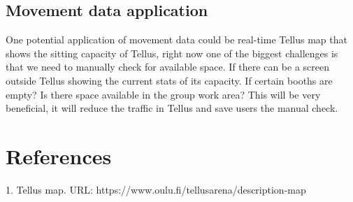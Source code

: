 \documentclass{article}
\begin{document}
\subsection{Movement data application}

One potential application of movement data could be real-time Tellus map that shows the sitting
capacity of Tellus, right now one of the biggest challenges is that we need to manually check for
available space. If there can be a screen outside Tellus showing the current stats of its capacity.
If certain booths are empty? Is there space available in the group work area? This will be very
beneficial, it will reduce the traffic in Tellus and save users the manual check.


\section{References}

1. Tellus map. URL: https://www.oulu.fi/tellusarena/description-map
\end{document}
